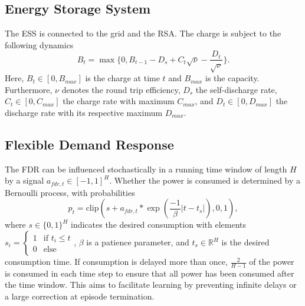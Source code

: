 \subsection{Energy Storage System}
The ESS is connected to the grid and the RSA. The charge is subject to the following dynamics
\begin{equation}
    B_t = \max\{0, B_{t-1} - D_s + C_t \sqrt{\nu} - \frac{D_t}{\sqrt{\nu}}\}.
\end{equation}
Here, $B_t \in [0, B_{max}]$ is the charge at time $t$ and $B_{max}$ is the capacity. Furthermore, $\nu$ denotes the round trip efficiency, $D_s$ the self-discharge rate, $C_t \in [0, C_{max}]$ the charge rate with maximum $C_{max}$, and $D_t \in [0, D_{max}]$ the discharge rate with its respective maximum $D_{max}$. 

\subsection{Flexible Demand Response}
The FDR can be influenced stochastically in a running time window of length $H$ by a signal $a_{fdr, t} \in [-1 , 1]^H$. Whether the power is consumed is determined by a Bernoulli process, with probabilities
\begin{equation}
    p_t = \text{clip}\left(s + a_{fdr, t} * \exp\left(\frac{-1}{\beta}\left|t - t_{s}\right|\right), 0, 1\right),
\end{equation}
where $s \in \{0,1\}^{H}$ indicates the desired consumption with elements $s_i = \begin{cases}
    1 & \text{if } t_i \leq t \\
    0 & \text{else}
\end{cases}$, $\beta$ is a patience parameter, and $t_{s} \in \mathbb{R}^{H}$ is the desired consumption time. If consumption is delayed more than once, $\frac{2}{H-1}$ of the power is consumed in each time step to ensure that all power has been consumed after the time window. This aims to facilitate learning by preventing infinite delays or a large correction at episode termination.

